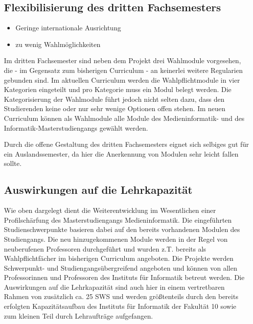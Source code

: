 \subsection{Flexibilisierung des dritten
Fachsemesters}\label{flexibilisierung-des-dritten-fachsemesters}

\begin{itemize}
\tightlist
\item
  Geringe internationale Ausrichtung
\item
  zu wenig Wahlmöglichkeiten
\end{itemize}

Im dritten Fachsemester sind neben dem Projekt drei Wahlmodule
vorgesehen, die - im Gegensatz zum bisherigen Curriculum - an keinerlei
weitere Regularien gebunden sind. Im aktuellen Curriculum werden die
Wahlpflichtmodule in vier Kategorien eingeteilt und pro Kategorie muss
ein Modul belegt werden. Die Kategorisierung der Wahlmodule führt jedoch
nicht selten dazu, dass den Studierenden keine oder nur sehr wenige
Optionen offen stehen. Im neuen Curriculum können als Wahlmodule alle
Module des Medieninformatik- und des Informatik-Masterstudiengangs
gewählt werden.

Durch die offene Gestaltung des dritten Fachsemesters eignet sich
selbiges gut für ein Auslandssemester, da hier die Anerkennung von
Modulen sehr leicht fallen sollte.

\subsection{Auswirkungen auf die
Lehrkapazität}\label{auswirkungen-auf-die-lehrkapazituxe4t-1}

Wie oben dargelegt dient die Weiterentwicklung im Wesentlichen einer
Profilschärfung des Masterstudiengangs Medieninformatik. Die
eingeführten Studienschwerpunkte basieren dabei auf den bereits
vorhandenen Modulen des Studiengangs. Die neu hinzugekommenen Module
werden in der Regel von neuberufenen Professoren durchgeführt und wurden
z.T. bereits als Wahlpflichtfächer im bisherigen Curriculum angeboten.
Die Projekte werden Schwerpunkt- und Studiengangsübergreifend angeboten
und können von allen Professorinnen und Professoren des Instituts für
Informatik betreut werden. Die Auswirkungen auf die Lehrkapazität sind
auch hier in einem vertretbaren Rahmen von zusätzlich ca. 25 SWS und
werden größtenteils durch den bereits erfolgten Kapazitätsaufbau des
Instituts für Informatik der Fakultät 10 sowie zum kleinen Teil durch
Lehraufträge aufgefangen.

